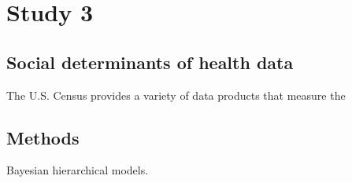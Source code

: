 
\section{Study 3}





\subsection{Social determinants of health data}

The U.S. Census provides a variety of data products that measure the

\subsection{Methods}

Bayesian hierarchical models.
